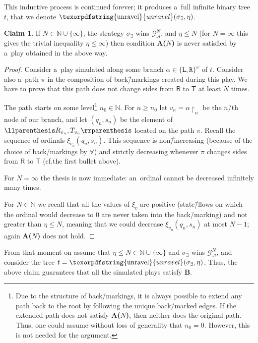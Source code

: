 \documentclass[11pt,a4paper]{amsart}
\theoremstyle{plain}
\theoremstyle{definition}
\newtheorem{clm}[thm]{Claim}
\theoremstyle{defC}
\theoremstyle{thmC}
\theoremstyle{plain}
\numberwithin{equation}{section}
\numberwithin{equation}{section}
\numberwithin{figure}{section}
\newcommand{\ident}[1]{\ensuremath{\texorpdfstring{\mathrm{\mathnm{#1}}}{#1}}\xspace}
\newcommand{\domain}[1]{\ensuremath{\mathbb{#1}}\xspace}
\newcommand{\N}{\domain{N}}
\newcommand{\mathcalsym}[1]{\ensuremath{\mathcal{#1}}\xspace}
\newcommand{\CA}{\mathcalsym{A}}
\newcommand{\CG}{\mathcalsym{G}}
\newcommand{\dL}{\mathtt{{\scriptstyle L}}}
\newcommand{\dR}{\mathtt{{\scriptstyle R}}}
\newcommand{\mathnm}[1]{#1}
\newcommand{\restr}{{\upharpoonright}}
\newcommand{\unravel}{\ident{unravel}}
\newcommand{\sT}{\mathsf{T}}
\newcommand{\sR}{\mathsf{R}}
\newcommand{\eve}{\ensuremath{\exists}\xspace}
\newcommand{\adam}{\ensuremath{\forall}\xspace}
\DeclarePairedDelimiter{\pair}{\llparenthesis}{\rrparenthesis}
\newcommand{\itemfont}[1]{\textbf{#1}}
\begin{document}
This inductive process is continued forever; it produces a~full infinite binary tree $t$, that we denote $\unravel(\sigma_\eve, \eta)$.

\begin{clm}
	If $N\in\N\cup\{\infty\}$, the strategy $\sigma_\eve$ wins $\CG^N_\CA$, and $\eta\leq N$ (for $N=\infty$ this gives the trivial inequality $\eta\leq \infty$)
	then condition \itemfont{A($N$)} is never satisfied by a~play obtained in the above way.
\end{clm}

\begin{proof}
	Consider a~play simulated along some branch $\alpha\in\{\dL,\dR\}^\omega$ of $t$.
	Consider also a~path $\pi$ in the composition of back\=/markings created during this play.
	We have to prove that this path does not change sides from $\sR$ to $\sT$ at least $N$ times.
		
	The path starts on some level\footnote{Due to the structure of back\=/markings, it is always possible to extend any path back to the root by following the unique back\=/marked edges. If the extended path does not satisfy \itemfont{A($N$)}, then neither does the original path. Thus, one could assume without loss of generality that $n_0=0$. However, this is not needed for the argument.} $n_0\in\N$.
	For $n\geq n_0$ let $v_n=\alpha\restr_n$ be the $n$\=/th node of our branch, and let $(q_n,s_n)$ be the element of $\pair{R_{v_n},T_{v_n}}$ located on the path $\pi$.
	Recall the sequence of ordinals $\xi_{v_n}(q_n,s_n)$.
	This sequence is non\=/increasing (because of the choice of back\=/markings by \adam) and strictly decreasing whenever $\pi$ changes sides from $\sR$ to $\sT$ (cf.\@ the first bullet above).
	
	For $N=\infty$ the thesis is now immediate: an~ordinal cannot be decreased infinitely many times.
	
	For $N\in\N$ we recall that all the values of $\xi_v$ are positive (state\=/flows on which the ordinal would decrease to $0$ are never taken into the back\=/marking) and not greater than $\eta\leq N$,
	meaning that we could decrease $\xi_{v_n}(q_n,s_n)$ at most $N{-}1$;
	again \itemfont{A($N$)} does not hold.
\end{proof}

From that moment on assume that $\eta\leq N\in\N\cup\{\infty\}$ and $\sigma_\eve$ wins $\CG^N_\CA$, and consider the tree $t=\unravel(\sigma_\eve,\eta)$.
Thus, the above claim guarantees that all the simulated plays satisfy \itemfont{B}.
\end{document}
